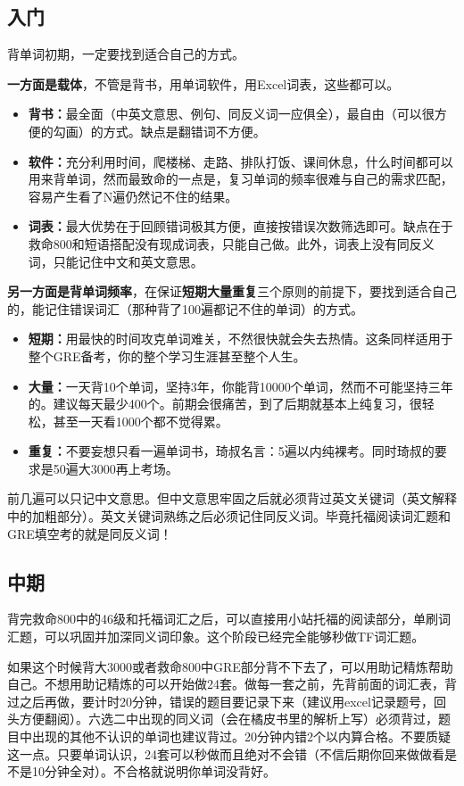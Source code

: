 \documentclass[cn,plain]{./src/qyxfbook}
\begin{document}
\subsection{入门}
背单词初期，一定要找到适合自己的方式。

\textbf{一方面是载体}，不管是背书，用单词软件，用Excel词表，这些都可以。

\begin{itemize}
    \item \textbf{背书：}最全面（中英文意思、例句、同反义词一应俱全），最自由（可以很方便的勾画）的方式。缺点是翻错词不方便。
    \item \textbf{软件：}充分利用时间，爬楼梯、走路、排队打饭、课间休息，什么时间都可以用来背单词，然而最致命的一点是，复习单词的频率很难与自己的需求匹配，容易产生看了N遍仍然记不住的结果。
    \item \textbf{词表：}最大优势在于回顾错词极其方便，直接按错误次数筛选即可。缺点在于救命800和短语搭配没有现成词表，只能自己做。此外，词表上没有同反义词，只能记住中文和英文意思。
\end{itemize}

\textbf{另一方面是背单词频率}，在保证\textbf{短期大量重复}三个原则的前提下，要找到适合自己的，能记住错误词汇（那种背了100遍都记不住的单词）的方式。

\begin{itemize}
    \item \textbf{短期：}用最快的时间攻克单词难关，不然很快就会失去热情。这条同样适用于整个GRE备考，你的整个学习生涯甚至整个人生。
    \item \textbf{大量：}一天背10个单词，坚持3年，你能背10000个单词，然而不可能坚持三年的。建议每天最少400个。前期会很痛苦，到了后期就基本上纯复习，很轻松，甚至一天看1000个都不觉得累。
    \item \textbf{重复：}不要妄想只看一遍单词书，琦叔名言：5遍以内纯裸考。同时琦叔的要求是50遍大3000再上考场。
\end{itemize}

前几遍可以只记中文意思。但中文意思牢固之后就必须背过英文关键词（英文解释中的加粗部分）。英文关键词熟练之后必须记住同反义词。毕竟托福阅读词汇题和GRE填空考的就是同反义词！

\subsection{中期}背完救命800中的46级和托福词汇之后，可以直接用小站托福的阅读部分，单刷词汇题，可以巩固并加深同义词印象。这个阶段已经完全能够秒做TF词汇题。

如果这个时候背大3000或者救命800中GRE部分背不下去了，可以用助记精炼帮助自己。不想用助记精炼的可以开始做24套。做每一套之前，先背前面的词汇表，背过之后再做，要计时20分钟，错误的题目要记录下来（建议用excel记录题号，回头方便翻阅）。六选二中出现的同义词（会在橘皮书里的解析上写）必须背过，题目中出现的其他不认识的单词也建议背过。20分钟内错2个以内算合格。不要质疑这一点。只要单词认识，24套可以秒做而且绝对不会错（不信后期你回来做做看是不是10分钟全对）。不合格就说明你单词没背好。
\end{document}
